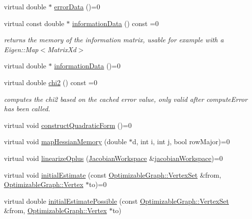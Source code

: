 \begin{DoxyCompactItemize}
virtual double $\ast$ \hyperlink{classg2o_1_1OptimizableGraph_1_1Edge_a460a0cb0256b0a91edb131e25181f57b}{error\+Data} ()=0
\item 
virtual const double $\ast$ \hyperlink{classg2o_1_1OptimizableGraph_1_1Edge_ab5b315b3e0a6c4e29074b2c924460417}{information\+Data} () const =0
\begin{DoxyCompactList}\small\item\em returns the memory of the information matrix, usable for example with a Eigen\+::\+Map$<$\+Matrix\+Xd$>$ \end{DoxyCompactList}\item 
virtual double $\ast$ \hyperlink{classg2o_1_1OptimizableGraph_1_1Edge_a99de4bbb57e3c5e7321f150a45d1cb12}{information\+Data} ()=0
\item 
virtual double \hyperlink{classg2o_1_1OptimizableGraph_1_1Edge_a182bd2c109d50283c638d9b295f2f3d7}{chi2} () const =0
\begin{DoxyCompactList}\small\item\em computes the chi2 based on the cached error value, only valid after compute\+Error has been called. \end{DoxyCompactList}\item 
virtual void \hyperlink{classg2o_1_1OptimizableGraph_1_1Edge_a56fbf3430ddf591e3c619bdd1b7e4499}{construct\+Quadratic\+Form} ()=0
\item 
virtual void \hyperlink{classg2o_1_1OptimizableGraph_1_1Edge_a3bd233fd552daa166039acf47b69a5a7}{map\+Hessian\+Memory} (double $\ast$d, int i, int j, bool row\+Major)=0
\item 
virtual void \hyperlink{classg2o_1_1OptimizableGraph_1_1Edge_a0fdad5ebfb4efec9f893b57f67e0fbe1}{linearize\+Oplus} (\hyperlink{classg2o_1_1JacobianWorkspace}{Jacobian\+Workspace} \&\hyperlink{structg2o_1_1OptimizableGraph_aa669dbd1d6e34e49fecda711ff1b78c6}{jacobian\+Workspace})=0
\item 
virtual void \hyperlink{classg2o_1_1OptimizableGraph_1_1Edge_a9519f8892e97f03daacb44ea50ac7f4e}{initial\+Estimate} (const \hyperlink{classg2o_1_1HyperGraph_a703938cdb4bb636860eed55a2489d70c}{Optimizable\+Graph\+::\+Vertex\+Set} \&from, \hyperlink{classg2o_1_1OptimizableGraph_1_1Vertex}{Optimizable\+Graph\+::\+Vertex} $\ast$to)=0
\item 
virtual double \hyperlink{classg2o_1_1OptimizableGraph_1_1Edge_a1cef6ffa0f82f1ad3dd3d7a9f04425ee}{initial\+Estimate\+Possible} (const \hyperlink{classg2o_1_1HyperGraph_a703938cdb4bb636860eed55a2489d70c}{Optimizable\+Graph\+::\+Vertex\+Set} \&from, \hyperlink{classg2o_1_1OptimizableGraph_1_1Vertex}{Optimizable\+Graph\+::\+Vertex} $\ast$to)

\end{DoxyCompactItemize}
